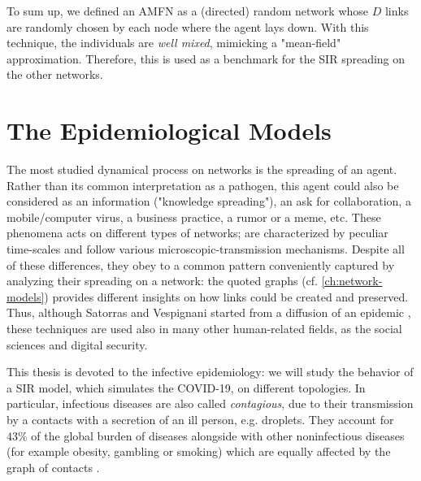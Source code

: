 \documentclass[a4paper,10pt, oneside]{book} %
\theoremstyle{definition}
\begin{document}
To sum up, we defined an AMFN as a (directed) random network whose $D$ links are randomly chosen by each node where the agent lays down. With this technique, the individuals are \textit{well mixed}, mimicking a "mean-field" approximation. Therefore, this is used as a benchmark for the SIR spreading on the other networks.

\chapter{The Epidemiological Models}
\label{ch:sir-models}	
The most studied dynamical process on networks is the spreading of an agent. Rather than its common interpretation as a pathogen, this agent could also be considered as an information ("knowledge spreading"), an ask for collaboration, a mobile/computer virus, a business practice, a rumor or a meme, etc. These phenomena acts on different types of networks; are characterized by peculiar time-scales and follow various microscopic-transmission mechanisms. Despite all of these differences, they obey to a common pattern conveniently captured by analyzing their spreading on a network: the quoted graphs (cf. \autoref{ch:network-models}) provides different insights on how links could be created and preserved. Thus, although Satorras and Vespignani started from a diffusion of an epidemic \cite{VespignaniSatorras2001Epidemic}, these techniques are used also in many other human-related fields, as the social sciences and digital security.

This thesis is devoted to the infective epidemiology: we will study the behavior of a SIR model, which simulates the COVID-19, on different topologies. In particular, infectious diseases are also called \textit{contagious}, due to their transmission by a contacts with a secretion of an ill person, e.g. droplets. They account for $43\%$ of the global burden of diseases alongside with other noninfectious diseases (for example obesity, gambling or smoking) which are equally affected by the graph of contacts \cite{barabasi::2016networkbook}.
\end{document}
